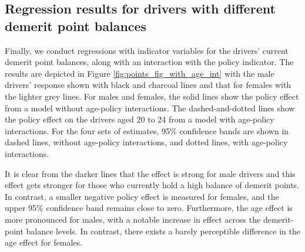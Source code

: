 \documentclass{cje}
\begin{document}
\subsection{Regression results for drivers with different demerit point balances}
\label{sec:Empirical_w_pts_grp}

Finally, we conduct regressions with indicator variables 
for the drivers' current demerit point balances, 
along with an interaction with the policy indicator. 
% 
The results are depicted in Figure \ref{fig:points_fig_with_age_int}
with the male drivers' response shown with black and charcoal lines
and that for females with the lighter grey lines. 
For males and females, the solid lines show the policy effect 
from a model without age-policy interactions. 
The dashed-and-dotted lines show the policy effect 
on the drivers aged 20 to 24 from a model with age-policy interactions. 
For the four sets of estimates, 95\% confidence bands are shown in 
dashed lines, without age-policy interactions,
and dotted lines, with age-policy interactions.

It is clear from the darker lines 
that the effect is strong for male drivers and this effect gets stronger for 
those who currently hold a high balance of demerit points. 
In contrast, a smaller negative policy effect is measured for females, and the upper 95\% confidence band 
remains close to zero. 
Furthermore, the age effect is more pronounced for males, 
with a notable increase in effect across the demerit-point balance levels. 
In contrast, there exists a barely perceptible difference in the age effect for females. 
\end{document}
